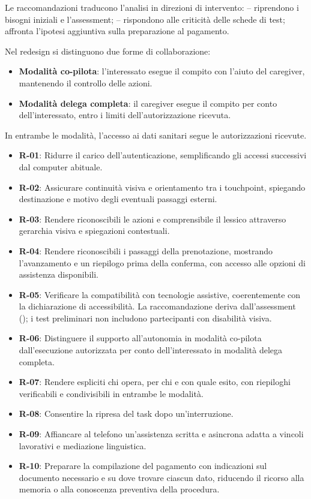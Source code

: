 Le raccomandazioni traducono l'analisi in direzioni di intervento:
-- riprendono i bisogni iniziali e l'assessment; --
rispondono alle criticità delle schede di test;  affronta l'ipotesi
aggiuntiva sulla preparazione al pagamento.

Nel redesign si distinguono due forme di collaborazione:
\begin{itemize}
\item \textbf{Modalità co-pilota}: l'interessato esegue il compito con
  l'aiuto del caregiver, mantenendo il controllo delle azioni.
\item \textbf{Modalità delega completa}: il caregiver esegue il compito
  per conto dell'interessato, entro i limiti dell'autorizzazione ricevuta.
\end{itemize}
In entrambe le modalità, l'accesso ai dati sanitari segue le autorizzazioni ricevute.

\begin{itemize}
\item \hypertarget{req:R-01}{}\textbf{R-01}: Ridurre il carico dell'autenticazione, semplificando
  gli accessi successivi dal computer abituale.
\item \hypertarget{req:R-02}{}\textbf{R-02}: Assicurare continuità visiva e orientamento tra i
  touchpoint, spiegando destinazione e motivo degli eventuali passaggi esterni.
\item \hypertarget{req:R-03}{}\textbf{R-03}: Rendere riconoscibili le azioni e comprensibile il lessico
  attraverso gerarchia visiva e spiegazioni contestuali.
\item \hypertarget{req:R-04}{}\textbf{R-04}: Rendere riconoscibili i passaggi della prenotazione,
  mostrando l’avanzamento e un riepilogo prima della conferma, con accesso
  alle opzioni di assistenza disponibili.
\item \hypertarget{req:R-05}{}\textbf{R-05}: Verificare la compatibilità con tecnologie assistive,
  coerentemente con la dichiarazione di accessibilità.
  La raccomandazione deriva dall'assessment (); i test
  preliminari non includono partecipanti con disabilità visiva.
\item \hypertarget{req:R-06}{}\textbf{R-06}: Distinguere il supporto all'autonomia in modalità
  co-pilota dall'esecuzione autorizzata per conto dell'interessato in
  modalità delega completa.
\item \hypertarget{req:R-07}{}\textbf{R-07}: Rendere espliciti chi opera, per chi e con quale esito,
  con riepiloghi verificabili e condivisibili in entrambe le modalità.
\item \hypertarget{req:R-08}{}\textbf{R-08}: Consentire la ripresa del task dopo un'interruzione.
\item \hypertarget{req:R-09}{}\textbf{R-09}: Affiancare al telefono un'assistenza scritta e asincrona
  adatta a vincoli lavorativi e mediazione linguistica.
\item \hypertarget{req:R-10}{}\textbf{R-10}: Preparare la compilazione del pagamento con indicazioni
  sul documento necessario e su dove trovare ciascun dato, riducendo il
  ricorso alla memoria o alla conoscenza preventiva della procedura.
\end{itemize}

